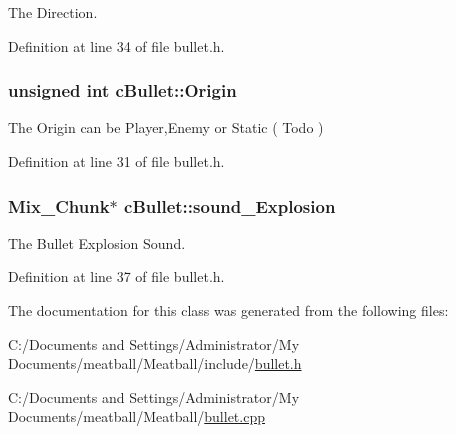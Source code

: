 The Direction. 



Definition at line 34 of file bullet.\-h.

\hypertarget{classc_bullet_a66bf644008f15b642e59514778d0dd42}{
\subsubsection[{Origin}]{\setlength{\rightskip}{0pt plus 5cm}unsigned int c\-Bullet\-::\-Origin}}\label{classc_bullet_a66bf644008f15b642e59514778d0dd42}


The Origin can be Player,Enemy or Static ( Todo ) 



Definition at line 31 of file bullet.\-h.

\hypertarget{classc_bullet_a05793bd5f273e252f3f491c532d45be1}{
\subsubsection[{sound\-\_\-\-Explosion}]{\setlength{\rightskip}{0pt plus 5cm}Mix\-\_\-\-Chunk$\ast$ c\-Bullet\-::sound\-\_\-\-Explosion}}\label{classc_bullet_a05793bd5f273e252f3f491c532d45be1}


The Bullet Explosion Sound. 



Definition at line 37 of file bullet.\-h.



The documentation for this class was generated from the following files\-:\begin{DoxyCompactItemize}
\item 
C\-:/\-Documents and Settings/\-Administrator/\-My Documents/meatball/\-Meatball/include/\hyperlink{bullet_8h}{bullet.\-h}\item 
C\-:/\-Documents and Settings/\-Administrator/\-My Documents/meatball/\-Meatball/\hyperlink{bullet_8cpp}{bullet.\-cpp}\end{DoxyCompactItemize}
